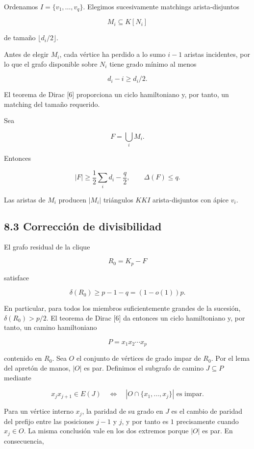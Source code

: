 \documentclass[
  spanish,
  11pt,
  a4paper,
]{article}
\begin{document}
Ordenamos \(I=\{v_1,\ldots,v_q\}\). Elegimos sucesivamente matchings arista-disjuntos

\[
M_i\subseteq K[N_i]
\]

de tamaño \(\lfloor d_i/2\rfloor\).

Antes de elegir \(M_i\), cada vértice ha perdido a lo sumo \(i-1\) aristas incidentes, por lo que el grafo disponible sobre \(N_i\) tiene grado mínimo al menos

\[
d_i-i\ge d_i/2.
\]

El teorema de Dirac {[}6{]} proporciona un ciclo hamiltoniano y, por tanto, un matching del tamaño requerido.

Sea

\[
F=\bigcup_iM_i.
\]

Entonces

\[
|F|
\ge
\frac12\sum_i d_i-\frac q2,
\qquad
\Delta(F)\le q.
\tag{8.3}
\]

Las aristas de \(M_i\) producen \(|M_i|\) triángulos \(KKI\) arista-disjuntos con ápice \(v_i\).

\subsection{8.3 Corrección de divisibilidad}\label{correcciuxf3n-de-divisibilidad}

El grafo residual de la clique

\[
R_0=K_p-F
\]

satisface

\[
\delta(R_0)
\ge
p-1-q
=(1-o(1))p.
\tag{8.4}
\]

En particular, para todos los miembros suficientemente grandes de la sucesión, \(\delta(R_0)>p/2\). El teorema de Dirac {[}6{]} da entonces un ciclo hamiltoniano y, por tanto, un camino hamiltoniano

\[
P=x_1x_2\cdots x_p
\]

contenido en \(R_0\). Sea \(O\) el conjunto de vértices de grado impar de \(R_0\). Por el lema del apretón de manos, \(|O|\) es par. Definimos el subgrafo de camino \(J\subseteq P\) mediante

\[
x_jx_{j+1}\in E(J)
\quad\Longleftrightarrow\quad
|O\cap\{x_1,\ldots,x_j\}|\text{ es impar}.
\tag{8.5}
\]

Para un vértice interno \(x_j\), la paridad de su grado en \(J\) es el cambio de paridad del prefijo entre las posiciones \(j-1\) y \(j\), y por tanto es \(1\) precisamente cuando \(x_j\in O\). La misma conclusión vale en los dos extremos porque \(|O|\) es par. En consecuencia,
\end{document}
